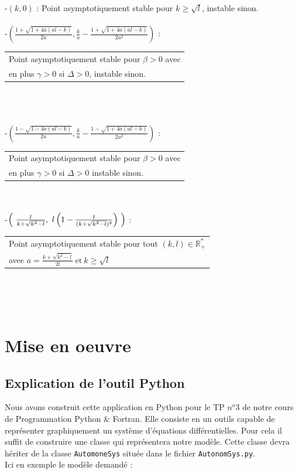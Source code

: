 \documentclass{article}
\begin{document}
\noindent
-$(k,0)$ : Point asymptotiquement stable pour $ k \geqslant \sqrt{l} $, instable sinon.\\\\

\noindent
-$\left(\frac{1 + \sqrt{1 + 4a(al -k)}}{2a}, \frac{k}{a} - \frac{1 + \sqrt{1 + 4a(al -k)}}{2a^2} \right)$ : 
\begin{tabular}{l}
    Point asymptotiquement stable pour $\beta > 0$ avec \\
    en plus $\gamma > 0$ si $\Delta > 0$, instable sinon.
\end{tabular}\\\\\\

\noindent
-$\left(\frac{1  - \sqrt{1 - 4a(al -k)}}{2a}, \frac{k}{a} - \frac{1 - \sqrt{1 + 4a(al -k)}}{2a^2} \right)$ :
\begin{tabular}{l}
    Point asymptotiquement stable pour $\beta > 0$ avec \\ en plus $\gamma > 0$ si $\Delta >0$ instable sinon.
\end{tabular}\\\\

\noindent
-$\left(\ \frac{l}{k \\+ \sqrt{k^2 - l}},\ l\left(1 - \frac{l}{(k + \sqrt{k^2 - l})^2} \right)\ \right)$ : 
\begin{tabular}{l}
Point asymptotiquement stable pour tout $(k,l) \in \mathbb{R}_+^*$\\
avec $a = \frac{k + \sqrt{k^2 - l} }{2l}\ \text{et}\ k \geqslant \sqrt{l}$\\
\end{tabular}\\\\\\

\newpage
\setcounter{secnumdepth}{2}
\newpage
\section{Mise en oeuvre}
\vspace{0.5cm}
\subsection{Explication de l'outil Python}
\vspace{0.5cm}
Nous avons construit cette application en Python pour le TP $n^o$3 de notre cours de Programmation Python \& Fortran. Elle consiste en un outils capable de représenter graphiquement un système d'équations différentielles. Pour cela il suffit de construire une classe qui représentera notre modèle. Cette classe devra hériter de la classe \verb|AutomoneSys| située dans le fichier \verb|AutonomSys.py|. \\
Ici en exemple le modèle demandé :
\vspace{0.5cm}
\end{document}
